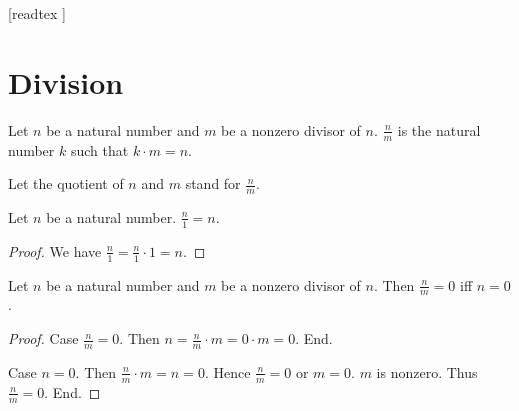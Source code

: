 \documentclass[10pt]{article}
\begin{document}
  \begin{imports}
    \begin{forthel}
      [readtex ]
    \end{forthel}
  \end{imports}


  \section*{Division}

  \begin{forthel}
    \begin{definition}
      Let $n$ be a natural number and $m$ be a nonzero divisor of $n$.
      $\frac{n}{m}$ is the natural number $k$ such that $k \cdot m = n$.
    \end{definition}

    Let the quotient of $n$ and $m$ stand for $\frac{n}{m}$.
  \end{forthel}

  \begin{forthel}
    \begin{proposition}
      Let $n$ be a natural number.
      $\frac{n}{1} = n$.
    \end{proposition}
    \begin{proof}
      We have $\frac{n}{1}
        = \frac{n}{1} \cdot 1
        = n$.
    \end{proof}
  \end{forthel}

  \begin{forthel}
    \begin{proposition}
      Let $n$ be a natural number and $m$ be a nonzero divisor of $n$.
      Then $\frac{n}{m} = 0$ iff $n = 0$.
    \end{proposition}
    \begin{proof}
      Case $\frac{n}{m} = 0$.
        Then $n
          = \frac{n}{m} \cdot m
          = 0 \cdot m
          = 0$.
      End.

      Case $n = 0$.
        Then $\frac{n}{m} \cdot m
          = n
          = 0$.
        Hence $\frac{n}{m} = 0$ or $m = 0$.
        $m$ is nonzero.
        Thus $\frac{n}{m} = 0$.
      End.
    \end{proof}
  \end{forthel}
\end{document}
